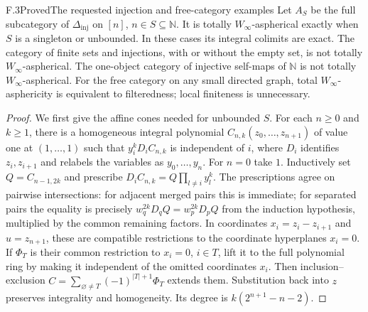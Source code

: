 \begin{claim}{F.3}{Proved}{The requested injection and free-category examples}
Let $A_S$ be the full subcategory of $\Delta_{\mathrm{inj}}$ on $[n]$, $n\in S\subseteq\mathbb N$. It is totally $W_\infty$-aspherical exactly when $S$ is a singleton or unbounded. In these cases its integral colimits are exact. The category of finite sets and injections, with or without the empty set, is not totally $W_\infty$-aspherical. The one-object category of injective self-maps of $\mathbb N$ is not totally $W_\infty$-aspherical. For the free category on any small directed graph, total $W_\infty$-asphericity is equivalent to filteredness; local finiteness is unnecessary.
\end{claim}
\begin{proof}
We first give the affine cones needed for unbounded $S$. For each $n\geq0$ and $k\geq1$, there is a homogeneous integral polynomial $C_{n,k}(z_0,\ldots,z_{n+1})$ of value one at $(1,\ldots,1)$ such that $y_i^kD_iC_{n,k}$ is independent of $i$, where $D_i$ identifies $z_i,z_{i+1}$ and relabels the variables as $y_0,\ldots,y_n$. For $n=0$ take $1$. Inductively set $Q=C_{n-1,2k}$ and prescribe
$D_iC_{n,k}=Q\prod_{l\ne i}y_l^k$.
The prescriptions agree on pairwise intersections: for adjacent merged pairs this is immediate; for separated pairs the equality is precisely $w_q^{2k}D_qQ=w_p^{2k}D_pQ$ from the induction hypothesis, multiplied by the common remaining factors. In coordinates $x_i=z_i-z_{i+1}$ and $u=z_{n+1}$, these are compatible restrictions to the coordinate hyperplanes $x_i=0$. If $\Phi_T$ is their common restriction to $x_i=0$, $i\in T$, lift it to the full polynomial ring by making it independent of the omitted coordinates $x_i$. Then inclusion--exclusion
$C=\sum_{\varnothing\ne T}(-1)^{|T|+1}\Phi_T$
extends them. Substitution back into $z$ preserves integrality and homogeneity. Its degree is $k(2^{n+1}-n-2)$.


\end{proof}
